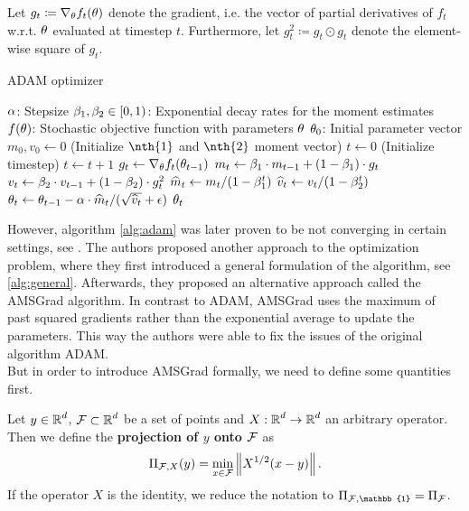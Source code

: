 \begin{algorithm}[H]
Let $g_t\coloneqq \nabla_{\theta}f_t(\theta)$ denote the gradient, i.e. the vector of partial derivatives of $f_t$ w.r.t. $\theta$ evaluated at timestep $t$. Furthermore,  let $g_t^2 \coloneqq g_t \odot g_t$ denote the element-wise square of $g_t$.
\caption{ADAM optimizer}\label{alg:adam}
\begin{algorithmic}[1]
\Require $\alpha$: Stepsize
\Require $\beta_1,\beta_2\in [0,1)$: Exponential decay rates for the moment estimates
\Require $f(\theta)$: Stochastic objective function with parameters $\theta$
\Require $\theta_0$: Initial parameter vector
\State $m_0,v_0 \gets 0$ (Initialize $\nth{1}$ and $\nth{2}$ moment vector)
\State $t \gets 0$ (Initialize timestep)
\State $t\gets t+1$
\State $g_t \gets \nabla_{\theta}f_t(\theta_{t-1})$ 
\State $m_t \gets\beta_1 \cdot m_{t-1} + (1-\beta_1)\cdot g_t$ 
\State $v_t \gets\beta_2 \cdot v_{t-1} + (1-\beta_2)\cdot g_t^2$ 
\State $\widehat{m}_t \gets m_t/(1-\beta_1^t)$ 
\State $\widehat{v}_t \gets v_t/(1-\beta_2^t)$ 
\State $\theta_t \gets \theta_{t-1} - \alpha\cdot \widehat{m}_t / (\sqrt{\widehat{v}_t} + \operatorname{\epsilon})$ 
\EndWhile
\State \Return $\theta_t$ 
\end{algorithmic}
\end{algorithm}

However, algorithm \ref{alg:adam} was later proven to be not converging in certain settings, see \cite{reddi2019convergence}. The authors proposed another approach to the optimization problem, where they first introduced a general formulation of the algorithm, see \ref{alg:general}. Afterwards, they proposed an alternative approach called the AMSGrad algorithm. In contrast to ADAM, AMSGrad uses the maximum of past squared gradients rather than the exponential average to update the parameters. This way the authors were able to fix the issues of the original algorithm ADAM.\\
But in order to introduce AMSGrad formally, we need to define some quantities first.

\begin{definition}\label{def:projection}
Let $y\in\operatorname{\mathbb{R}}^d$, $\operatorname{\mathcal{F}}\subset\operatorname{\mathbb{R}}^d$ be a set of points and $X:\operatorname{\mathbb{R}}^d\to\operatorname{\mathbb{R}}^d$ an arbitrary operator. Then we define the \textbf{projection of $y$ onto $\operatorname{\mathcal{F}}$} as
\begin{align*}
\Pi_{\operatorname{\mathcal{F}},X} (y) = \min_{x\in\operatorname{\mathcal{F}}} \left\|X^{1/2}(x - y) \right\|.
\end{align*}
If the operator $X$ is the identity, we reduce the notation to $\Pi_{\F,\mathbb{1}} = \Pi_{\F}$.
\end{definition}

